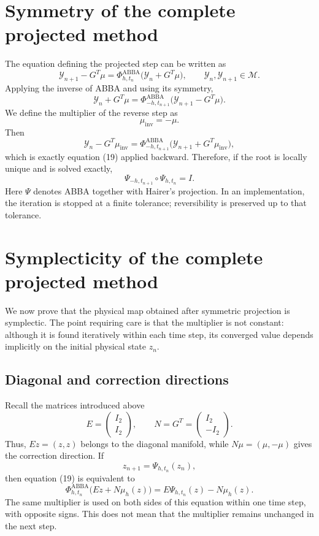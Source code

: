 \documentclass[11pt,a4paper]{article}
\newcommand{\Id}{I}
\newcommand{\Y}{\mathcal{Y}}
\newcommand{\M}{\mathcal{M}}
\newcommand{\PhiAB}{\Phi^{\mathrm{ABBA}}_{h,t_n}}
\begin{document}
\section{Symmetry of the complete projected method}

The equation defining the projected step can be written as
\[
 \boxed{
 \Y_{n+1}-G^T\mu
 =\Phi^{\mathrm{ABBA}}_{h,t_n}
  \bigl(\Y_n+G^T\mu\bigr),
 \qquad
 \Y_n,\Y_{n+1}\in\M.
 } \tag{19}
\]
Applying the inverse of ABBA and using its symmetry,
\[
 \Y_n+G^T\mu
 =\Phi^{\mathrm{ABBA}}_{-h,t_{n+1}}
  \bigl(\Y_{n+1}-G^T\mu\bigr).
\]
We define the multiplier of the reverse step as
\[
 \mu_{\mathrm{inv}}=-\mu.
\]
Then
\[
 \Y_n-G^T\mu_{\mathrm{inv}}
 =\Phi^{\mathrm{ABBA}}_{-h,t_{n+1}}
  \bigl(\Y_{n+1}+G^T\mu_{\mathrm{inv}}\bigr),
\]
which is exactly equation (19) applied backward. Therefore, if the root is locally unique
and is solved exactly,
\[
 \boxed{
 \Psi_{-h,t_{n+1}}\circ\Psi_{h,t_n}=\Id.
 } \tag{20}
\]
Here $\Psi$ denotes ABBA together with Hairer's projection. In an implementation, the
iteration is stopped at a finite tolerance; reversibility is preserved up to that tolerance.

\section{Symplecticity of the complete projected method}

We now prove that the physical map obtained after symmetric projection is symplectic.
The point requiring care is that the multiplier is not constant: although it is found
iteratively within each time step, its converged value depends implicitly on the initial
physical state $z_n$.

\subsection{Diagonal and correction directions}

Recall the matrices introduced above
\[
 E=
 \begin{pmatrix}
  \Id_2\\ \Id_2
 \end{pmatrix},
 \qquad
 N=G^T=
 \begin{pmatrix}
  \Id_2\\ -\Id_2
 \end{pmatrix}.
\]
Thus, $Ez=(z,z)$ belongs to the diagonal manifold, while
$N\mu=(\mu,-\mu)$ gives the correction direction. If
\[
 z_{n+1}=\Psi_{h,t_n}(z_n),
\]
then equation (19) is equivalent to
\[
 \boxed{
 \PhiAB\bigl(Ez+N\mu_h(z)\bigr)
 =E\Psi_{h,t_n}(z)-N\mu_h(z).
 } \tag{21}
\]
The same multiplier is used on both sides of this equation within one time step, with
opposite signs. This does not mean that the multiplier remains unchanged in the next step.
\end{document}
